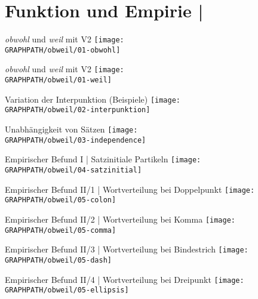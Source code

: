 \section[Empirie]{Funktion und Empirie | \citet{SchaeferSayatz2016}}

\begin{frame}
  {\textit{obwohl} und \textit{weil} mit V2}
  \centering 
  \texttt{[image: \\GRAPHPATH/obweil/01-obwohl]}
\end{frame}

\begin{frame}
  {\textit{obwohl} und \textit{weil} mit V2}
  \centering 
  \texttt{[image: \\GRAPHPATH/obweil/01-weil]}
\end{frame}

\begin{frame}
  {Variation der Interpunktion (Beispiele)}
  \centering 
  \texttt{[image: \\GRAPHPATH/obweil/02-interpunktion]}
\end{frame}

\begin{frame}
  {Unabhängigkeit von Sätzen}
  \centering 
  \texttt{[image: \\GRAPHPATH/obweil/03-independence]} 
\end{frame}

\begin{frame}
  {Empirischer Befund I | Satzinitiale Partikeln}
  \centering 
  \texttt{[image: \\GRAPHPATH/obweil/04-satzinitial]}
\end{frame}

\begin{frame}
  {Empirischer Befund II/1 | Wortverteilung bei Doppelpunkt}
  \centering 
  \texttt{[image: \\GRAPHPATH/obweil/05-colon]}
\end{frame}

\begin{frame}
  {Empirischer Befund II/2 | Wortverteilung bei Komma}
  \centering 
  \texttt{[image: \\GRAPHPATH/obweil/05-comma]}
\end{frame}

\begin{frame}
  {Empirischer Befund II/3 | Wortverteilung bei Bindestrich}
  \centering 
  \texttt{[image: \\GRAPHPATH/obweil/05-dash]}
\end{frame}

\begin{frame}
  {Empirischer Befund II/4 | Wortverteilung bei Dreipunkt}
  \centering 
  \texttt{[image: \\GRAPHPATH/obweil/05-ellipsis]}
\end{frame}

